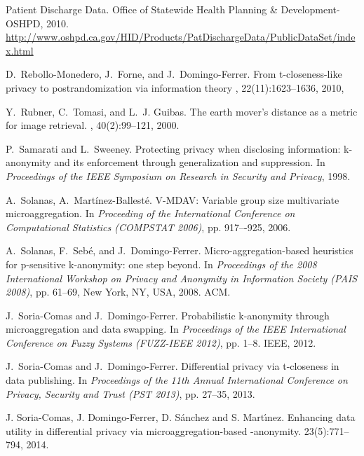 \documentclass[10pt,journal,compsoc]{IEEEtran}
\theoremstyle{definition}
\theoremstyle{plain}
\begin{document}
\begin{thebibliography}{10}
	Patient Discharge Data. 
	\newblock Office of Statewide Health Planning \& Development-OSHPD, 2010. 
\newblock \url{http://www.oshpd.ca.gov/HID/Products/PatDischargeData/PublicDataSet/index.html}
	
	D.~Rebollo-Monedero, J.~Forne, and J.~Domingo-Ferrer.
	\newblock From t-closeness-like privacy to postrandomization via information theory
	, 22(11):1623--1636, 2010, 
	
	Y.~Rubner, C.~Tomasi, and L.~J. Guibas.
	\newblock The earth mover's distance as a metric for image retrieval.
	, 40(2):99--121, 2000.
	
	P.~Samarati and L.~Sweeney.
	\newblock Protecting privacy when disclosing information: k-anonymity and its
	enforcement through generalization and suppression.
	\newblock In {\em Proceedings of the IEEE Symposium on Research in Security and
		Privacy}, 1998.
	
	A.~Solanas, A.~Mart{\'i}nez-Ballest{\'e}.
	\newblock V-MDAV: Variable group size multivariate microaggregation.
	\newblock In {\em Proceeding of the International Conference on Computational 
		Statistics (COMPSTAT 2006)}, pp. 917–-925, 2006.
	
	A.~Solanas, F.~Seb{\'e}, and J.~Domingo-Ferrer.
	\newblock Micro-aggregation-based heuristics for p-sensitive k-anonymity: one
	step beyond.
	\newblock In {\em Proceedings of the 2008 International Workshop on Privacy and
		Anonymity in Information Society (PAIS 2008)}, pp. 61--69, New York, NY, USA,
	2008. ACM.
	
	J.~Soria-Comas and J.~Domingo-Ferrer.
	\newblock Probabilistic k-anonymity through microaggregation and data swapping.
	\newblock In {\em Proceedings of the IEEE International Conference on Fuzzy
		Systems (FUZZ-IEEE 2012)}, pp. 1--8. IEEE, 2012.
	
	J.~Soria-Comas and J.~Domingo-Ferrer.
	\newblock Differential privacy via t-closeness in data publishing.
	\newblock In {\em Proceedings of the 11th Annual International Conference on
		Privacy, Security and Trust (PST 2013)}, pp. 27--35, 2013.
	
 J. Soria-Comas, J. Domingo-Ferrer,
D. S\'anchez and S. Mart\'{\i}nez.
\newblock Enhancing data utility in differential privacy via 
microaggregation-based -anonymity.
 23(5):771--794, 2014. 


\end{thebibliography}
\end{document}
